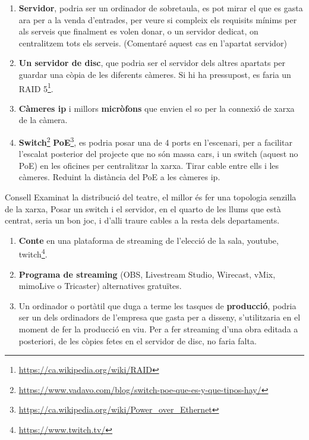 \documentclass[
  10pt,
]{krantz}
\DeclareRobustCommand{\href}[2]{#2\footnote{\url{#1}}}
\begin{document}
\begin{enumerate}
\def\labelenumi{\arabic{enumi}.}
\item
  \textbf{Servidor}, podria ser un ordinador de sobretaula, es pot mirar el que es gasta ara per a la venda d'entrades, per veure si compleix els requisits mínims per als serveis que finalment es volen donar, o un servidor dedicat, on centralitzem tots els serveis. (Comentaré aquest cas en l'apartat servidor)
\item
  \textbf{Un servidor de disc}, que podria ser el servidor dels altres apartats per guardar una còpia de les diferents càmeres. Si hi ha pressupost, es faria un \href{https://ca.wikipedia.org/wiki/RAID}{RAID 5}.
\item
  \textbf{Càmeres ip} i millors \textbf{micròfons} que envien el so per la connexió de xarxa de la càmera.
\item
  \href{https://www.vadavo.com/blog/switch-poe-que-es-y-que-tipos-hay/}{\textbf{Switch}} \href{https://ca.wikipedia.org/wiki/Power_over_Ethernet}{\textbf{PoE}}, es podria posar una de 4 ports en l'escenari, per a facilitar l'escalat posterior del projecte que no són massa cars, i un switch (aquest no PoE) en les oficines per centralitzar la xarxa. Tirar cable entre ells i les càmeres. Reduint la distància del PoE a les càmeres ip.
\end{enumerate}

\begin{rmdtip}{Consell}
Examinat la distribució del teatre, el millor és fer una topologia senzilla de la xarxa, Posar un switch i el servidor, en el quarto de les llums que està centrat, seria un bon joc, i d'alli traure cables a la resta dels departaments.

\end{rmdtip}

\begin{enumerate}
\def\labelenumi{\arabic{enumi}.}
\setcounter{enumi}{4}
\item
  \textbf{Conte} en una plataforma de streaming de l'elecció de la sala, youtube, \href{https://www.twitch.tv/}{twitch}.
\item
  \textbf{Programa de streaming} (OBS, Livestream Studio, Wirecast, vMix, mimoLive o Tricaster) alternatives gratuïtes.
\item
  Un ordinador o portàtil que duga a terme les tasques de \textbf{producció}, podria ser un dels ordinadors de l'empresa que gasta per a disseny, s'utilitzaria en el moment de fer la producció en viu. Per a fer streaming d'una obra editada a posteriori, de les còpies fetes en el servidor de disc, no faria falta.
\end{enumerate}
\end{document}
